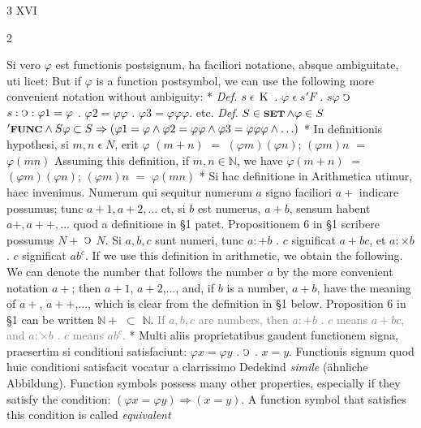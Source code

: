 \documentclass{book}
\newcommand{\s}{\switchcolumn} %
\newcommand{\C}{\mathop{\sbox0{$\displaystyle$$\reflectbox{C}$} %
\raisebox{-\height+\ht0-0.05cm}[\ht0][\dp0]{\scalebox{0.8}[0.8]{\copy0}}}\displaylimits} %
\newcommand{\smallIn}{\ensuremath{\mathrel{\epsilon}}}
\newcommand{\K}{\mathop{\thinspace \text{K} \thinspace}}
\newcommand{\setOfSets}{\mathop{\text{{\footnotesize \textbf{SET}}}}}
\newcommand{\func}{\mathord{\text{{\footnotesize \textbf{FUNC}}}}}
\renewcommand{\rightarrow}{\Rightarrow}
\newcommand\irrelevant[1]{\textcolor{gray}{#1}}
\newcommand{\peanoPage}[1]{\vspace{1ex}

  \columnratio{0.475, 0.05, 0.475} \begin{paracol}{3} \centering \hdashrule{\columnwidth}{0.1mm}{0.1mm 1mm} \s #1 \s \hdashrule{\columnwidth}{0.1mm}{0.1mm 1mm} \end{paracol}

\vspace{1ex}}
\newenvironment{translateTwoCol}
               { %
                 \columnratio{0.5, 0.5}
                 \begin{paracol}{2}
                 \newcommand{\LAT}{\switchcolumn[0]*}
                 \newcommand{\ENG}{\switchcolumn[1]}
               }
               { %
                 \let\ENG\undefined
                 \let\LAT\undefined
                 \end{paracol}
               }
\begin{document}
\peanoPage{XVI} %

\begin{translateTwoCol}
Si vero $\varphi$ est functionis postsignum, ha faciliori notatione, absque ambiguitate, uti licet:
\ENG
But if $\varphi$ is a function postsymbol, we can use the following more convenient notation without ambiguity:
\LAT
\emph{Def.} \hspace{0.25cm} $s \smallIn \K$ . $\varphi \smallIn s 'F$ . $s \varphi$ $\C$ $s : \C : \varphi 1 = \varphi$ . $\varphi 2 = \varphi \varphi$ . $\varphi 3 = \varphi \varphi \varphi$. etc.
\ENG
\emph{Def.} \hspace{0.25cm} $S \in \setOfSets \wedge \varphi \in S$ $'\func \wedge S \varphi \subset S \rightarrow ( \varphi 1 = \varphi \wedge \varphi 2 = \varphi \varphi \wedge \varphi 3 = \varphi \varphi \varphi \wedge \ldots)$
\LAT
In definitionis hypothesi, si $m, n \smallIn N$, erit $\varphi$ $(m+n)$ $=$ $(\varphi m)(\varphi n)$; $(\varphi m)n$ $=$ $\varphi (m n)$
\ENG
Assuming this definition, if $m, n \in \mathbb{N}$, we have $\varphi(m+n)$ $=$ $(\varphi m)(\varphi n)$; $(\varphi m)n$ $=$ $\varphi (m n)$
\LAT
Si hac definitione in Arithmetica utimur, haec invenimus. Numerum qui sequitur numerum $a$ signo faciliori $a +$ indicare possumus; tunc $a + 1, a+2,...$ et, si $b$ est numerus, $a + b$, sensum habent $a +, a + +,...$ quod a definitione in \S 1 patet. Propositionem 6 in \S 1 scribere possumus $N +$ $\C$ $N$. Si $a, b, c$ sunt numeri, tunc $a : + b$ . $c$ significat $a + b c$, et $a : \times b$ . $c$ significat $a b^c$.
\ENG
If we use this definition in arithmetic, we obtain the following. We can denote the number that follows the number $a$ by the more convenient notation $a+$; then $a + 1$, $a + 2$,..., and, if $b$ is a number, $a + b$, have the meaning of $a +$, $a ++$,..., which is clear from the definition in \S 1 below. Proposition 6 in \S 1 can be written $\mathbb{N} +$ $\subset$ $\mathbb{N}$. \irrelevant{If $a, b, c$ are numbers, then $a : + b$ . $c$ means $a + b c$, and $a : \times b$ . $c$ means $a b^c$.} %
\LAT
Multi aliis proprietatibus gaudent functionem signa, praesertim si conditioni satisfaciunt: $\varphi x = \varphi y$ . $\C$ . $x = y$. Functionis signum quod huic conditioni satisfacit vocatur a clarrissimo Dedekind \emph{simile} (\"ahnliche Abbildung).
\ENG
Function symbols possess many other properties, especially if they satisfy the condition: $(\varphi x = \varphi y) \rightarrow (x = y)$. A function symbol that satisfies this condition is called \emph{equivalent}
\end{translateTwoCol}
\end{document}
